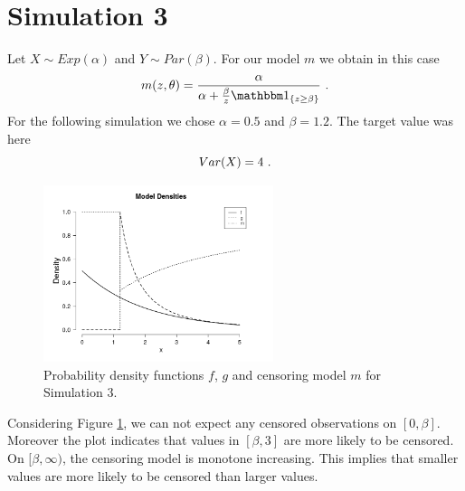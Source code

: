 \section{Simulation 3} \label{sec:sim_exppar}
Let $X \sim Exp(\alpha)$ and $Y \sim Par(\beta)$. For our model $m$ we obtain in this case
$$m(z,\theta) = \frac{\alpha}{\alpha + \frac{\beta}{z}\I{z \geq \beta}}\mdot$$
For the following simulation we chose $\alpha = 0.5$ and $\beta = 1.2$. The target value was here
$$Var(X) = 4\textrm{ .}$$
%
%
\begin{figure}[h!]
	\begin{center}
		\includegraphics[width=0.6\textwidth]{./figures/exppar_dens}
	\end{center}
	\caption{Probability density functions $f$, $g$ and censoring model $m$ for Simulation 3.}
	\label{fig:dens_exppar}
\end{figure}
%
Considering Figure \ref{fig:dens_exppar}, we can not expect any censored observations on $[0,\beta]$. Moreover the plot indicates that values in $[\beta,3]$ are more likely to be censored. On $[\beta,\infty)$, the censoring model is monotone increasing. This implies that smaller values are more likely to be censored than larger values.
\clearpage
